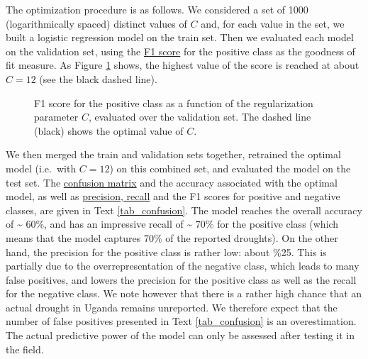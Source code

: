 \documentclass[10pt,parskip=half,
toc=sectionentrywithdots,
bibliography=totocnumbered,
captions=tableheading,numbers=noendperiod]{scrartcl}
\begin{document}
The optimization procedure is as follows. We considered a set of 1000
(logarithmically spaced) distinct values of \(C\) and, for each value in
the set, we built a logistic regression model on the train set. Then we
evaluated each model on the validation set, using the
\href{https://en.wikipedia.org/wiki/F1_score}{F1 score} for the positive
class as the goodness of fit measure. As Figure \ref{fig_cv} shows, the
highest value of the score is reached at about \(C=12\) (see the black
dashed line).

\begin{figure}[H]\begin{center}\end{center}\caption{F1 score for the positive class as a function of the regularization
parameter \(C\), evaluated over the validation set. The dashed line
(black) shows the optimal value of \(C\).}\label{fig_cv}\end{figure}

We then merged the train and validation sets together, retrained the
optimal model (i.e.~with \(C=12\)) on this combined set, and evaluated
the model on the test set. The
\href{https://en.wikipedia.org/wiki/Confusion_matrix}{confusion matrix}
and the accuracy associated with the optimal model, as well as
\href{https://en.wikipedia.org/wiki/Precision_and_recall}{precision,
recall} and the F1 scores for positive and negative classes, are given
in Text \ref{tab_confusion}. The model reaches the overall accuracy of
\textasciitilde{} 60\%, and has an impressive recall of
\textasciitilde{} 70\% for the positive class (which means that the
model captures 70\% of the reported droughts). On the other hand, the
precision for the positive class is rather low: about \%25. This is
partially due to the overrepresentation of the negative class, which
leads to many false positives, and lowers the precision for the positive
class as well as the recall for the negative class. We note however that
there is a rather high chance that an actual drought in Uganda remains
unreported. We therefore expect that the number of false positives
presented in Text \ref{tab_confusion} is an overestimation. The actual
predictive power of the model can only be assessed after testing it in
the field.
\end{document}
